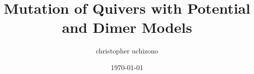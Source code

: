 \documentclass{beamer}
\title{Mutation of Quivers with Potential \\and Dimer Models}
\author{christopher uchizono}
\institute{University of the Pacific}
\date{\today}
\begin{document}
    \justifying

    
    

    
    
    

    
\end{document}
